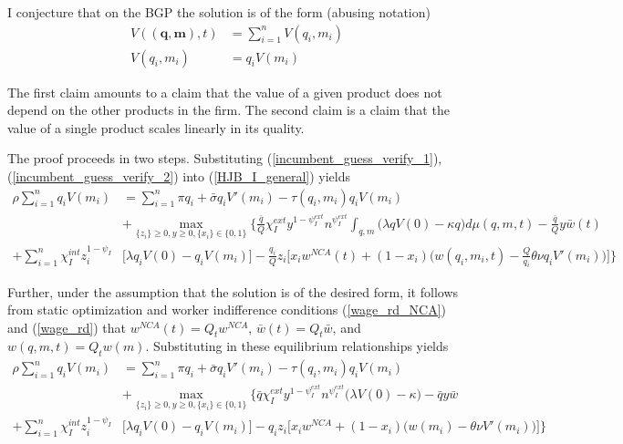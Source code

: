 \documentclass[12pt,english]{article}
\theoremstyle{remark}
\begin{document}
I conjecture that on the BGP the solution is of the form (abusing notation)
\begin{align}
V(\mathbf{(q,m)},t) &= \sum_{i=1}^n V(q_i,m_i) \label{incumbent_guess_verify_1} \\
V(q_i,m_i) &= q_i V(m_i) \label{incumbent_guess_verify_2}
\end{align}

The first claim amounts to a claim that the value of a given product does not depend on the other products in the firm. The second claim is a claim that the value of a single product scales linearly in its quality. 

The proof proceeds in two steps. Substituting (\ref{incumbent_guess_verify_1}),(\ref{incumbent_guess_verify_2}) into (\ref{HJB_I_general}) yields
\small
\begin{align}
\rho \sum_{i=1}^n q_i V(m_i) &= \sum_{i=1}^n \pi q_i + \bar{\sigma} q_i V'(m_i)  - \tau(q_i,m_i) q_i V(m_i) \nonumber \\ 
& + \max_{\{z_i\} \ge 0, y \ge 0, \{x_i\}\in \{0,1\}} \Bigg\{ \frac{\bar{q}}{Q}\chi_I^{ext} y^{1-\psi_I^{ext}} n^{\psi_I^{ext}} \int_{q,m} \Big(\lambda q V(0) - \kappa q \Big) d\mu(q,m,t) - \frac{\bar{q}}{Q} y \bar{w}(t) \nonumber \\
+ \sum_{i=1}^n \chi_I^{int} z_{i}^{1-\psi_I} &\Bigg[ \lambda q_i V(0) - q_i V(m_i) \Bigg] - \frac{q_i}{Q} z_{i} \Bigg[ x_i w^{NCA}(t) + (1-x_i) \Big( w(q_i,m_i,t) - \frac{Q}{q_i}\theta \nu q_i V'(m_i) \Big) \Bigg]\Bigg\} \label{HJB_I_guessAndVerify_1}
\end{align}
\normalsize 

Further, under the assumption that the solution is of the desired form, it follows from static optimization and worker indifference conditions (\ref{wage_rd_NCA}) and (\ref{wage_rd}) that $w^{NCA}(t) = Q_t w^{NCA}$, $\bar{w}(t) = Q_t \bar{w}$, and $w(q,m,t) = Q_t w(m)$. Substituting in these equilibrium relationships yields
\small
\begin{align}
\rho \sum_{i=1}^n q_i V(m_i) &= \sum_{i=1}^n \pi q_i + \bar{\sigma} q_i V'(m_i)  - \tau(q_i,m_i) q_i V(m_i) \nonumber \\ 
& + \max_{\{z_i\} \ge 0, y \ge 0, \{x_i\} \in \{0,1\}} \Bigg\{ \bar{q} \chi_I^{ext} y^{1-\psi_I^{ext}} n^{\psi_I^{ext}} \Big( \lambda V(0) - \kappa \Big) - \bar{q} y \bar{w} \nonumber \\
+ \sum_{i=1}^n \chi_I^{int} z_{i}^{1-\psi_I} &\Bigg[ \lambda q_i V(0) - q_i V(m_i) \Bigg] - q_i z_{i} \Bigg[ x_i w^{NCA} + (1-x_i) \Big( w(m_i) - \theta \nu V'(m_i)\Big) \Bigg] \Bigg\} \label{HJB_I_guessAndVerify_2}
\end{align}
\normalsize 
 
\end{document}
